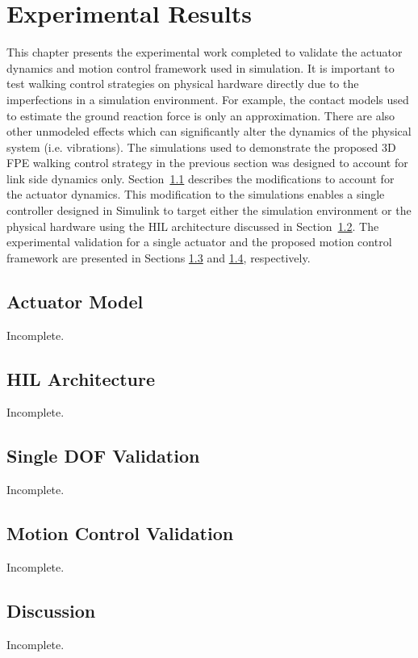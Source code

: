\chapter{Experimental Results} %
\label{cha:experiments}
This chapter presents the experimental work completed to validate the actuator dynamics and motion control framework used in simulation. It is important to test walking control strategies on physical hardware directly due to the imperfections in a simulation environment. For example, the contact models used to estimate the ground reaction force is only an approximation. There are also other unmodeled effects which can significantly alter the dynamics of the physical system (i.e. vibrations). The simulations used to demonstrate the proposed 3D FPE walking control strategy in the previous section was designed to account for link side dynamics only. Section~\ref{sec:actuator_model} describes the modifications to account for the actuator dynamics. This modification to the simulations enables a single controller designed in Simulink to target either the simulation environment or the physical hardware using the HIL architecture discussed in Section~\ref{sec:hil_architecture}. The experimental validation for a single actuator and the proposed motion control framework are presented in Sections \ref{sec:1dof_validation} and \ref{sec:motion_control_validation}, respectively. 

\section{Actuator Model} %
\label{sec:actuator_model}
Incomplete. 

\section{HIL Architecture} %
\label{sec:hil_architecture}
Incomplete. 

\section{Single DOF Validation} %
\label{sec:1dof_validation}
Incomplete. 

\section{Motion Control Validation} %
\label{sec:motion_control_validation}
Incomplete. 

\section{Discussion} %
\label{sec:experiments_discussion}
Incomplete. 

